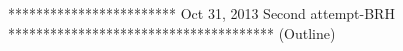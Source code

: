 % 

************************ Oct 31, 2013 Second attempt-BRH **************************************
(Outline)


